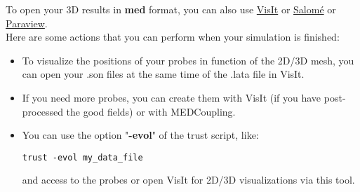 To open your 3D results in \textbf{med} format, you can also use \href{https://wci.llnl.gov/simulation/computer-codes/visit}{VisIt} or \href{http://www.salome-platform.org}{Salom\'e} or \href{http://www.paraview.org}{Paraview}.\\

Here are some actions that you can perform when your simulation is finished:
\begin{itemize}
\item To visualize the positions of your probes in function of the 2D/3D mesh, you can open your .son files at the same time of the .lata file in VisIt.
\item If you need more probes, you can create them with VisIt (if you have post-processed the good fields) or with MEDCoupling.
\item You can use the option "\textbf{-evol}" of the trust script, like:
\begin{verbatim}
trust -evol my_data_file
\end{verbatim}
and access to the probes or open VisIt for 2D/3D visualizations via this tool.
\end{itemize}



